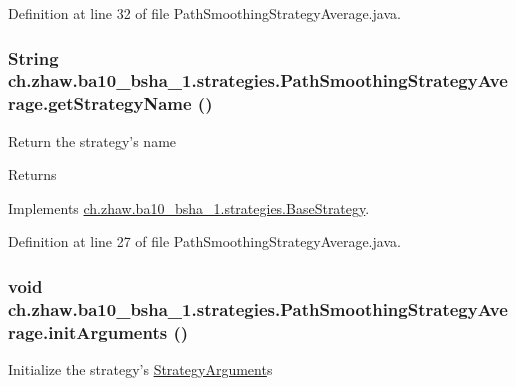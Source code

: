 Definition at line 32 of file PathSmoothingStrategyAverage.java.\hypertarget{classch_1_1zhaw_1_1ba10__bsha__1_1_1strategies_1_1PathSmoothingStrategyAverage_a3f53ea1550d9fd947e54fab6150b6ed9}{
\subsubsection[{getStrategyName}]{\setlength{\rightskip}{0pt plus 5cm}String ch.zhaw.ba10\_\-bsha\_\-1.strategies.PathSmoothingStrategyAverage.getStrategyName ()}}
\label{classch_1_1zhaw_1_1ba10__bsha__1_1_1strategies_1_1PathSmoothingStrategyAverage_a3f53ea1550d9fd947e54fab6150b6ed9}
Return the strategy's name

\begin{DoxyReturn}{Returns}

\end{DoxyReturn}


Implements \hyperlink{classch_1_1zhaw_1_1ba10__bsha__1_1_1strategies_1_1BaseStrategy_aa0ebed55eed45409bad13d43a0058780}{ch.zhaw.ba10\_\-bsha\_\-1.strategies.BaseStrategy}.

Definition at line 27 of file PathSmoothingStrategyAverage.java.\hypertarget{classch_1_1zhaw_1_1ba10__bsha__1_1_1strategies_1_1PathSmoothingStrategyAverage_ac9f904cba7b0ae18e9e6b0d6caefeac9}{
\subsubsection[{initArguments}]{\setlength{\rightskip}{0pt plus 5cm}void ch.zhaw.ba10\_\-bsha\_\-1.strategies.PathSmoothingStrategyAverage.initArguments ()}}
\label{classch_1_1zhaw_1_1ba10__bsha__1_1_1strategies_1_1PathSmoothingStrategyAverage_ac9f904cba7b0ae18e9e6b0d6caefeac9}
Initialize the strategy's \hyperlink{classch_1_1zhaw_1_1ba10__bsha__1_1_1StrategyArgument}{StrategyArgument}s 

